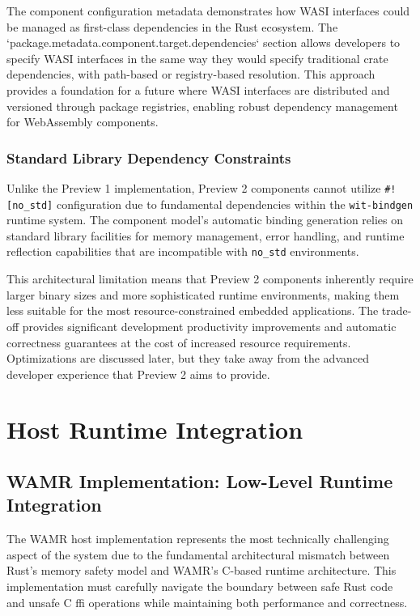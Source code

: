 The component configuration metadata demonstrates how WASI interfaces could be managed as first-class dependencies in the Rust ecosystem. The `package.metadata.component.target.dependencies` section allows developers to specify WASI interfaces in the same way they would specify traditional crate dependencies, with path-based or registry-based resolution. This approach provides a foundation for a future where WASI interfaces are distributed and versioned through package registries, enabling robust dependency management for WebAssembly components.

\subsubsection{Standard Library Dependency Constraints}

Unlike the Preview 1 implementation, Preview 2 components cannot utilize \texttt{\#![no\_std]} configuration due to fundamental dependencies within the \texttt{wit-bindgen} runtime system. The component model's automatic binding generation relies on standard library facilities for memory management, error handling, and runtime reflection capabilities that are incompatible with \texttt{no\_std} environments.

This architectural limitation means that Preview 2 components inherently require larger binary sizes and more sophisticated runtime environments, making them less suitable for the most resource-constrained embedded applications. The trade-off provides significant development productivity improvements and automatic correctness guarantees at the cost of increased resource requirements. Optimizations are discussed later, but they take away from the advanced developer experience that Preview 2 aims to provide.

\section{Host Runtime Integration}
\label{sec:host-runtime-integration}

\subsection{WAMR Implementation: Low-Level Runtime Integration}

The WAMR host implementation represents the most technically challenging aspect of the system due to the fundamental architectural mismatch between Rust's memory safety model and WAMR's C-based runtime architecture. This implementation must carefully navigate the boundary between safe Rust code and unsafe C \acrshort{ffi} operations while maintaining both performance and correctness.

